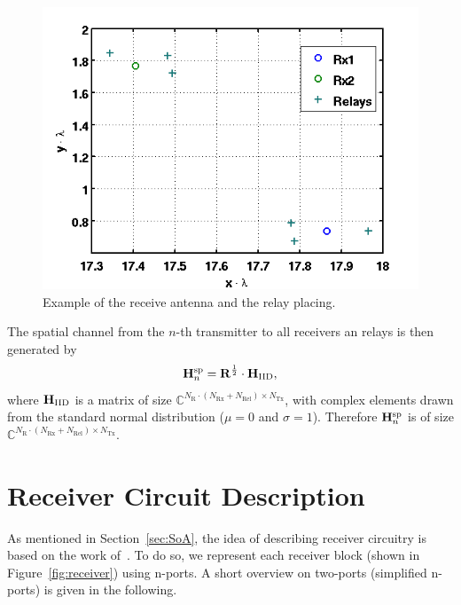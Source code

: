\begin{figure}[h]
\begin{center}
\includegraphics[width=\textwidth]{images/antennae_position.png}
\caption{Example of the receive antenna and the relay placing.}
\label{fig:antenna_placing}
\end{center}
\end{figure}

The spatial channel from the $n$-th transmitter to all receivers an relays is then generated by
\begin{equation}
\label{eq:spatial_channel}
\mathbf{H}_{n}^{\text{sp}} = \mathbf{R}^{\frac{1}{2}}\cdot\mathbf{H}_\text{IID},
\end{equation} 
where $\mathbf{H}_\text{IID}$ is a matrix of size $\mathbb{C}^{N_\text{R}\cdot \left(N_\text{Rx} + N_\text{Rel}\right) \times N_\text{Tx}}$, with complex elements drawn from the standard normal distribution ($\mu = 0$ and $\sigma = 1$).
Therefore $\mathbf{H}_{n}^{\text{sp}}$ is of size $\mathbb{C}^{N_\text{R}\cdot \left(N_\text{Rx} + N_\text{Rel}\right) \times N_\text{Tx}}$.


\section{Receiver Circuit Description}
\label{sec:network_description}
As mentioned in Section~\ref{sec:SoA}, the idea of describing receiver circuitry is based on the work of~\cite{Nossek}.
To do so, we represent each receiver block (shown in Figure~\ref{fig:receiver}) using n-ports.
A short overview on two-ports (simplified n-ports) is given in the following.

